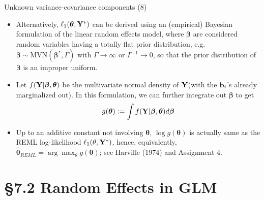\documentclass{beamer}
\newcommand{\currentsection}{}
\let\oldsection\section
\renewcommand{\section}[1]{\oldsection{#1}\renewcommand{\currentsection}{#1}}
\newcommand{\boldbeta}{{\boldsymbol \beta}}
\newcommand{\boldtheta}{{\boldsymbol \theta}}
\newenvironment{wideitemize}%
  {\begin{itemize}%
    \setlength{\parskip}{1em}}%
  {\end{itemize}}
\begin{document}
\begin{frame} {Unknown variance-covariance components (8)}

\begin{wideitemize}


\item Alternatively, $\ell_1( {\boldsymbol \theta},{\bf Y}^* )$ can be derived using an (empirical) Bayesian formulation of the linear random effects
model, where $\boldbeta$ are considered random variables having a totally flat prior
distribution, e.g. $\boldbeta\sim \text{MVN}(\boldbeta^*, \Gamma)$ with
$\Gamma\rightarrow \infty$ or $\Gamma^{-1}\rightarrow 0$, so that the prior distribution of $\boldbeta$
is an improper uniform.

\item Let $f({\bf Y}| {\boldsymbol \beta}, {\boldsymbol \theta} )$ be the multivariate normal density of  ${\bf Y}$(with the $ {\bf b}_i$'s already marginalized out). In this formulation, we can further integrate out ${\boldsymbol \beta}$ to get 
\[
g({\boldsymbol \theta}) := \int  f({\bf Y}| {\boldsymbol \beta}, {\boldsymbol \theta} ) d {\boldsymbol \beta}
\]

\item Up to an additive constant not involving $\boldtheta$,  $\log g({\boldsymbol \theta}) $ is actually same as the REML log-likelihood $\ell_1(\theta, {\bf Y}^*)$, hence, equivalently, $\hat{\boldsymbol \theta}_{REML} = \arg \max_{\theta}   g({\boldsymbol \theta})$; see Harville (1974) and Assignment 4.






\end{wideitemize}


\end{frame}







 
\section{\S7.2 Random Effects in GLM}\label{sec:7.2}
\end{document}
